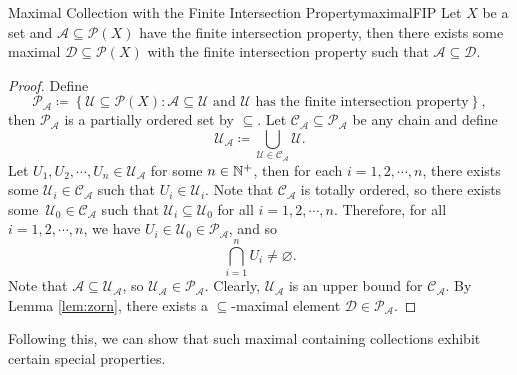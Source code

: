 \documentclass[math]{amznotes}
\theoremstyle{remark}
\begin{document}
\begin{probox}{Maximal Collection with the Finite Intersection Property}{maximalFIP}
    Let $X$ be a set and $\mathcal{A} \subseteq \mathcal{P}\left(X\right)$ have the finite intersection property, then there exists some maximal $\mathcal{D} \subseteq \mathcal{P}\left(X\right)$ with the finite intersection property such that $\mathcal{A} \subseteq \mathcal{D}$.
    \tcblower
    \begin{proof}
        Define 
        \begin{equation*}
            \mathscr{P}_{\mathcal{A}} \coloneqq \left\{\mathcal{U} \subseteq \mathcal{P}\left(X\right) \colon \mathcal{A} \subseteq \mathcal{U} \textrm{ and } \mathcal{U} \textrm{ has the finite intersection property} \right\},
        \end{equation*}
        then $\mathscr{P}_{\mathcal{A}}$ is a partially ordered set by $\subseteq$. Let $\mathscr{C}_{\mathcal{A}} \subseteq \mathscr{P}_{\mathcal{A}}$ be any chain and define 
        \begin{equation*}
            \mathcal{U}_{\mathcal{A}} \coloneqq \bigcup_{\mathcal{U} \in \mathscr{C}_{\mathcal{A}}}\mathcal{U}.
        \end{equation*}
        Let $U_1, U_2, \cdots, U_n \in \mathcal{U}_{\mathcal{A}}$ for some $n \in \mathbb{N}^+$, then for each $i = 1, 2, \cdots, n$, there exists some $\mathcal{U}_i \in \mathscr{C}_{\mathcal{A}}$ such that $U_i \in \mathcal{U}_i$. Note that $\mathscr{C}_{\mathcal{A}}$ is totally ordered, so there exists some~$\mathcal{U}_0 \in \mathscr{C}_{\mathcal{A}}$ such that $\mathcal{U}_i \subseteq \mathcal{U}_0$ for all $i = 1, 2, \cdots, n$. Therefore, for all $i = 1, 2, \cdots, n$, we have $U_i \in \mathcal{U}_0 \in \mathscr{P}_{\mathcal{A}}$, and so 
        \begin{equation*}
            \bigcap_{i = 1}^nU_i \neq \varnothing.
        \end{equation*}
        Note that $\mathcal{A} \subseteq \mathcal{U}_{\mathcal{A}}$, so $\mathcal{U}_{\mathcal{A}} \in \mathscr{P}_{\mathcal{A}}$. Clearly, $\mathcal{U}_{\mathcal{A}}$ is an upper bound for $\mathscr{C}_{\mathcal{A}}$. By Lemma \ref{lem:zorn}, there exists a $\subseteq$-maximal element $\mathcal{D} \in \mathscr{P}_{\mathcal{A}}$.
    \end{proof}
\end{probox}
Following this, we can show that such maximal containing collections exhibit certain special properties. 
\end{document}
